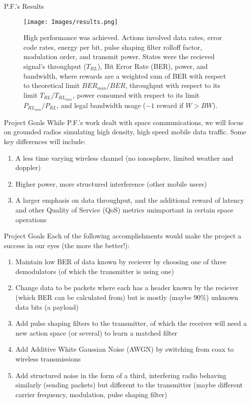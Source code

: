 \documentclass[pdf]{beamer}
\begin{document}
\begin{frame}[fragile]{P.F.'s Results}
\begin{figure}
\centering
\texttt{[image: Images/results.png]}
\caption{High performance was achieved. Actions involved data rates, error code rates, energy per bit, pulse shaping filter rolloff factor, modulation order, and transmit power. States were the recieved signal's throughput ($T_{RL}$), Bit Error Rate (BER), power, and bandwidth, where rewards are a weighted sum of BER with respect to theoretical limit $BER_{min}/BER$, throughput with respect to its limit $T_{RL}/T_{RL_{max}}$, power consumed with respect to its limit $P_{RL_{min}}/P_{RL}$, and legal bandwidth usage ($-1$ reward if $W > BW$). }
\end{figure}
\end{frame}

\begin{frame}[fragile]{Project Goals}
While P.F.'s work dealt with space communications, we will focus on grounded radios simulating high density, high speed mobile data traffic. Some key differences will include:
\begin{enumerate}
\item A less time varying wireless channel (no ionosphere, limited weather and doppler)
\item Higher power, more structured interference (other mobile users)
\item A larger emphasis on data throughput, and the additional reward of latency and other Quality of Service (QoS) metrics unimportant in certain space operations
\end{enumerate}
\end{frame}

\begin{frame}[fragile]{Project Goals}
Each of the following accomplishments would make the project a success in our eyes (the more the better!):
\begin{enumerate}
\item Maintain low BER of data known by reciever by choosing one of three demodulators (of which the transmitter is using one)
\item Change data to be packets where each has a header known by the reciever (which BER can be calculated from) but is mostly (maybe 90\%) unknown data bits (a payload)
\item Add pulse shaping filters to the transmitter, of which the receiver will need a new action space (or several) to learn a matched filter
\item Add Additive White Gaussian Noise (AWGN) by switching from coax to wireless transmissions
\item Add structured noise in the form of a third, interfering radio behaving similarly (sending packets) but different to the transmitter (maybe different carrier frequency, modulation, pulse shaping filter)
\end{enumerate}
\end{frame}
\end{document}
